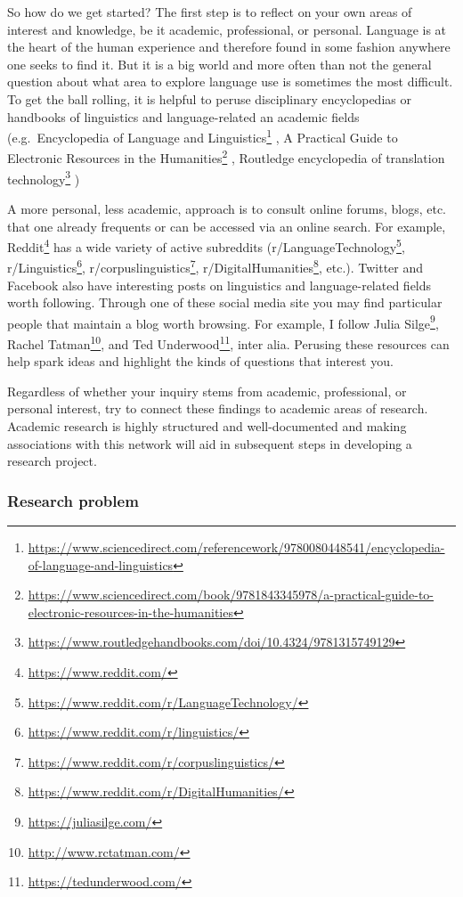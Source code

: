 \documentclass[
]{article}
\DeclareRobustCommand{\href}[2]{#2\footnote{\url{#1}}}
\begin{document}
So how do we get started? The first step is to reflect on your own areas of interest and knowledge, be it academic, professional, or personal. Language is at the heart of the human experience and therefore found in some fashion anywhere one seeks to find it. But it is a big world and more often than not the general question about what area to explore language use is sometimes the most difficult. To get the ball rolling, it is helpful to peruse disciplinary encyclopedias or handbooks of linguistics and language-related an academic fields (e.g.~\href{https://www.sciencedirect.com/referencework/9780080448541/encyclopedia-of-language-and-linguistics}{Encyclopedia of Language and Linguistics} \citep{Brown2005}, \href{https://www.sciencedirect.com/book/9781843345978/a-practical-guide-to-electronic-resources-in-the-humanities}{A Practical Guide to Electronic Resources in the Humanities} \citep{Dubnjakovic2010}, \href{https://www.routledgehandbooks.com/doi/10.4324/9781315749129}{Routledge encyclopedia of translation technology} \citep{Chan2014})

A more personal, less academic, approach is to consult online forums, blogs, etc. that one already frequents or can be accessed via an online search. For example, \href{https://www.reddit.com/}{Reddit} has a wide variety of active subreddits (\href{https://www.reddit.com/r/LanguageTechnology/}{r/LanguageTechnology}, \href{https://www.reddit.com/r/linguistics/}{r/Linguistics}, \href{https://www.reddit.com/r/corpuslinguistics/}{r/corpuslinguistics}, \href{https://www.reddit.com/r/DigitalHumanities/}{r/DigitalHumanities}, etc.). Twitter and Facebook also have interesting posts on linguistics and language-related fields worth following. Through one of these social media site you may find particular people that maintain a blog worth browsing. For example, I follow \href{https://juliasilge.com/}{Julia Silge}, \href{http://www.rctatman.com/}{Rachel Tatman}, and \href{https://tedunderwood.com/}{Ted Underwood}, inter alia. Perusing these resources can help spark ideas and highlight the kinds of questions that interest you.

Regardless of whether your inquiry stems from academic, professional, or personal interest, try to connect these findings to academic areas of research. Academic research is highly structured and well-documented and making associations with this network will aid in subsequent steps in developing a research project.

\hypertarget{research-problem}{%
\subsubsection{Research problem}\label{research-problem}}
\end{document}
